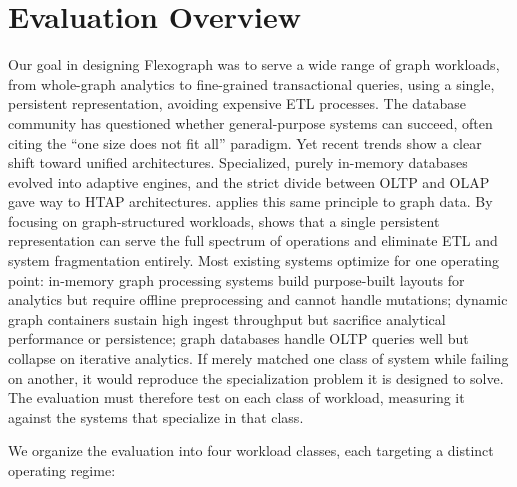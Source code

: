 \chapter{Evaluation Overview}
\label{ch:eval-overview}


Our goal in designing Flexograph was to serve a wide range of graph workloads, from whole-graph analytics to fine-grained transactional queries, using a single, persistent representation, avoiding expensive ETL processes.
The database community has questioned whether general-purpose systems can succeed, often citing the ``one size does not fit all'' paradigm.
Yet recent trends show a clear shift toward unified architectures.
Specialized, purely in-memory databases evolved into adaptive engines, and the strict divide between OLTP and OLAP gave way to HTAP architectures.
\project{} applies this same principle to graph data.
By focusing on graph-structured workloads, \project{} shows that a single persistent representation can serve the full spectrum of operations and eliminate ETL and system fragmentation entirely.
Most existing systems optimize for one operating point: in-memory graph processing systems build purpose-built layouts for analytics but require offline preprocessing and cannot handle mutations; dynamic graph containers sustain high ingest throughput but sacrifice analytical performance or persistence; graph databases handle OLTP queries well but collapse on iterative analytics.
If \project{} merely matched one class of system while failing on another, it would reproduce the specialization problem it is designed to solve.
The evaluation must therefore test \project{} on each class of workload, measuring it against the systems that specialize in that class.

We organize the evaluation into four workload classes, each targeting a distinct operating regime:


